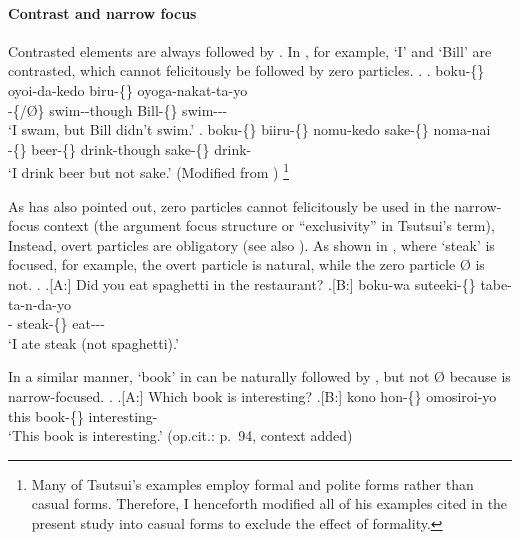 \paragraph{Contrast and narrow focus}

Contrasted elements are always followed by  \cite[p.~53ff.]{tsutsui84}.
In \Next[a], for example,
 `I' and  `Bill' are contrasted,
which cannot felicitously be followed by zero particles.
%
\ex.
 \ag. boku-\{\} oyoi-da-kedo biru-\{\} oyoga-nakat-ta-yo \\
      -\{/{\O}\} swim--though Bill-\{\} swim--- \\
      `I swam, but Bill didn't swim.'
 \bg. boku-\{\} biiru-\{\} nomu-kedo sake-\{\} noma-nai \\
      -\{\} beer-\{\} drink-though sake-\{\} drink- \\
      `I drink beer but not sake.'
      \hfill{(Modified from )}%
      \footnote{
      Many of Tsutsui's examples employ formal and polite forms
      rather than casual forms.
      Therefore, I henceforth modified all of his examples cited
      in the present study into casual forms
      to exclude the effect of formality.
      }


As  has also pointed out,
zero particles cannot felicitously be used
in the narrow-focus context
(the argument focus structure or ``exclusivity'' in Tsutsui's term),
Instead, overt particles are obligatory
(see also ).
As shown in \Next[B], where  `steak' is focused, for example,
the overt particle  is natural,
while the zero particle {\O} is not.
%
\ex.
 \a.[A:] Did you eat spaghetti in the restaurant?
 \bg.[B:] boku-wa suteeki-\{\} tabe-ta-n-da-yo \\
          - steak-\{\} eat--- \\
          `I ate steak (not spaghetti).'
          \hfill{\cite[p.~93, context added]{tsutsui84}}

In a similar manner,
 `book' in \Next[B] can be naturally followed by ,
but not {\O}
because  is narrow-focused.
%
\ex.
 \a.[A:] Which book is interesting?
 \bg.[B:] kono hon-\{\} omosiroi-yo \\
          this book-\{\} interesting- \\
          `This book is interesting.'
          \hfill{(op.cit.: p.~94, context added)}

